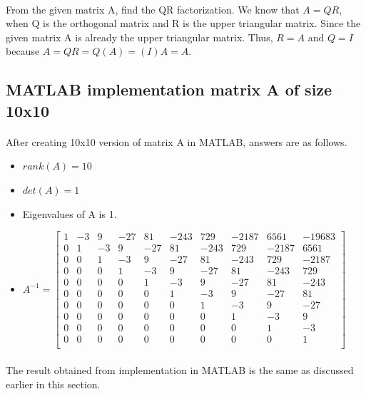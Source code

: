 \documentclass[a4paper]{article}
\begin{document}
\paragraph{}
From the given matrix A, find the QR factorization. We know that $A=QR$, when Q is the orthogonal matrix and R is the upper triangular matrix. Since the given matrix A is already the upper triangular matrix. Thus, $R=A$ and $Q=I$ because $A=QR=Q(A)=(I)A=A$.

\subsection*{MATLAB implementation matrix A of size 10x10}
\paragraph{}
After creating 10x10 version of matrix A in MATLAB, answers are as follows.
\begin{itemize}
    \item $rank(A) = 10$
    \item $det(A) = 1$
    \item Eigenvalues of A is 1.
    \item $ A^{-1} = \begin{bmatrix}
    1 &-3 &9 &-27 &81 &-243 &729 &-2187 &6561 &-19683 \\
    0 &1 &-3 &9 &-27 &81 &-243 &729 &-2187 &6561 \\
    0 &0 &1 &-3 &9 &-27 &81 &-243 &729 &-2187 \\
    0 &0 &0 &1 &-3 &9 &-27 &81 &-243 &729 \\
    0 &0 &0 &0 &1 &-3 &9 &-27 &81 &-243 \\
    0 &0 &0 &0 &0 &1 &-3 &9 &-27 &81 \\
    0 &0 &0 &0 &0 &0 &1 &-3 &9 &-27 \\
    0 &0 &0 &0 &0 &0 &0 &1 &-3 &9 \\
    0 &0 &0 &0 &0 &0 &0 &0 &1 &-3 \\
    0 &0 &0 &0 &0 &0 &0 &0 &0 &1 \\
    \end{bmatrix}$
\end{itemize}
\paragraph{}
The result obtained from implementation in MATLAB is the same as discussed earlier in this section. 
\end{document}
